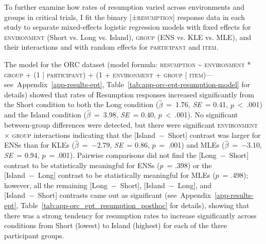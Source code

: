 To further examine how rates of resumption varied across environments and groups in critical trials, I fit the binary [\textsc{±resumption}] response data in each study to separate mixed-effects logistic regression models with fixed effects for \textsc{environment} (Short vs. Long vs. Island), \textsc{group} (ENS vs. KLE vs. MLE), and their interactions and with random effects for \textsc{participant} and \textsc{item}. 

The model for the ORC dataset (model formula: \textsc{resumption \~{} environment * group + (1 | participant) + (1 + environment + group | item)}---see~Appendix~\ref{app-results-ept}, Table~\ref{tab:app-orc-ept-resumption-model} for details) showed that rates of Resumption responses increased significantly from the Short condition to both the Long condition ($\hat{\beta}$~=~1.76, \textit{SE}~= 0.41, $p$~<~.001) and the Island condition ($\hat{\beta}$~=~3.98, \textit{SE}~= 0.40, $p$~<~.001). No significant between-group differences were detected, but there were significant \textsc{environment × group} interactions indicating that the [Island~−~Short] contrast was larger for ENSs than for KLEs ($\hat{\beta}$~=~−2.79, \textit{SE}~= 0.86, $p$~=~.001) and MLEs ($\hat{\beta}$~=~−3.10, \textit{SE}~= 0.94, $p$~= .001). Pairwise comparisons did not find the [Long~−~Short] contrast to be statistically meaningful for ENSs ($p$~= .398) or the [Island~−~Long] contrast to be statistically meaningful for MLEs ($p$~= .498); however, all the remaining [Long~−~Short], [Island~−~Long], and [Island~−~Short] contrasts came out as significant (see~Appendix~\ref{app-results-ept}, Table~\ref{tab:app-orc_ept_resumption_posthoc} for details), showing that there was a strong tendency for resumption rates to increase significantly across conditions from Short (lowest) to Island (highest) for each of the three participant groups. 

